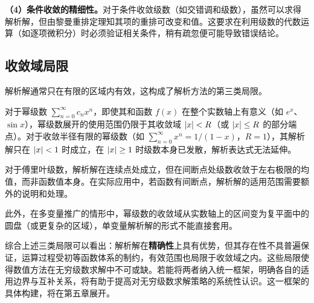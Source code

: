 \textbf{（4）条件收敛的精细性。}对于条件收敛级数（如交错调和级数），虽然可以求得解析解，但由黎曼重排定理知其项的重排可改变和值。这要求在利用级数的代数运算（如逐项微积分）时必须验证相关条件，稍有疏忽便可能导致错误结论。

\subsection{收敛域局限}

解析解通常只在有限的区域内有效，这构成了解析方法的第三类局限。

对于幂级数 $\displaystyle \sum_{n=0}^{\infty} c_n x^n$，即使其和函数 $f(x)$ 在整个实数轴上有意义（如 $e^x$、$\sin x$），幂级数展开的使用范围仍限于其收敛域 $\left|x\right| < R$（或 $\left|x\right| \leq R$ 的部分端点）。对于收敛半径有限的幂级数（如 $\displaystyle \sum_{n=0}^{\infty} x^n = 1/(1-x)$，$R = 1$），其解析解只在 $\left|x\right| < 1$ 时成立，在 $\left|x\right| \geq 1$ 时级数本身已发散，解析表达式无法延伸。

对于傅里叶级数，解析解在连续点处成立，但在间断点处级数收敛于左右极限的均值，而非函数值本身。在实际应用中，若函数有间断点，解析解的适用范围需要额外的说明和处理。

此外，在多变量推广的情形中，幂级数的收敛域从实数轴上的区间变为复平面中的圆盘（或更复杂的区域），单变量解析解的形式不能直接套用。

综合上述三类局限可以看出：解析解在\textbf{精确性}上具有优势，但其存在性不具普遍保证，运算过程受初等函数体系的制约，有效范围也局限于收敛域之内。这些局限使得数值方法在无穷级数求解中不可或缺。若能将两者纳入统一框架，明确各自的适用边界与互补关系，将有助于提高对无穷级数求解策略的系统性认识。这一框架的具体构建，将在第五章展开。
